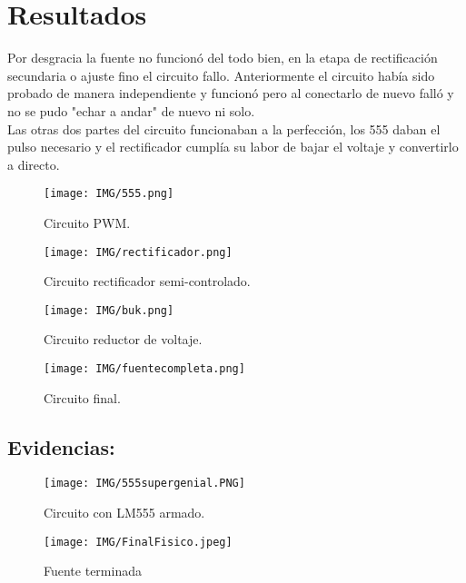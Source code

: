 \documentclass[letterpaper]{article}
\begin{document}
\section{Resultados}
\begin{large}
    Por desgracia la fuente no funcionó del todo bien, en la etapa de rectificación secundaria o ajuste fino el circuito fallo. Anteriormente el circuito había sido probado de manera independiente y funcionó pero al conectarlo de nuevo falló y no se pudo "echar a andar" de nuevo ni solo.\\
    Las otras dos partes  del circuito funcionaban a la perfección, los 555 daban el pulso necesario y el rectificador cumplía su labor de bajar el voltaje y convertirlo a directo.
\end{large}


\begin{figure}[htbp]
    \centering
    \texttt{[image: IMG/555.png]}
    \caption{Circuito PWM.}
    \label{fig:PWM}
\end{figure}

\begin{figure}[htbp]
    \centering
    \texttt{[image: IMG/rectificador.png]}
    \caption{Circuito rectificador semi-controlado.}
    \label{fig:SCR}
\end{figure}

\newpage

\begin{figure}[htbp]
    \centering
    \texttt{[image: IMG/buk.png]}
    \caption{Circuito reductor de voltaje.}
    \label{fig:BUKY}
\end{figure}

\begin{figure}[htbp]
    \centering
    \texttt{[image: IMG/fuentecompleta.png]}
    \caption{Circuito final.}
    \label{fig:FuenteBB}
\end{figure}

\newpage

\subsection{Evidencias:}
\begin{figure}[htbp]
    \centering
    \texttt{[image: IMG/555supergenial.PNG]}
    \caption{Circuito con LM555 armado.}
    \label{fig:555}
\end{figure}

\begin{figure}[htbp]
    \centering
    \texttt{[image: IMG/FinalFisico.jpeg]}
    \caption{Fuente terminada}
    \label{fig:Allaenlafuente}
\end{figure}
\end{document}
